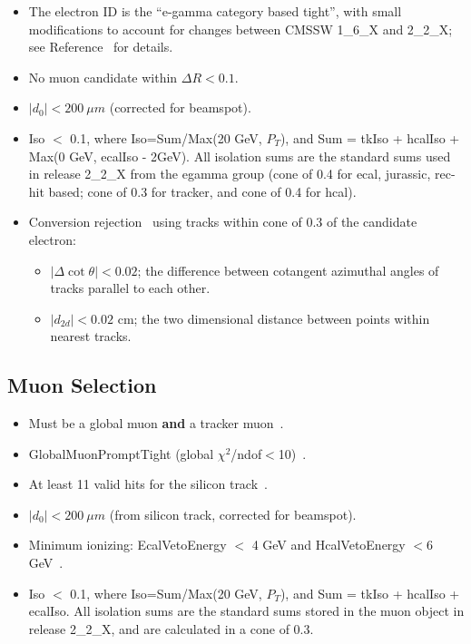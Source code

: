 \begin{itemize}
\item The electron ID is the ``e-gamma category based tight'', with small 
modifications to account for changes between CMSSW 1\_6\_X and 2\_2\_X; see Reference~\cite{ww} for details.
\item No muon candidate within $\Delta R < 0.1$.
\item $|d_0| < 200~\mu m$ (corrected for beamspot).
\item Iso $<$ 0.1, where Iso=Sum/Max(20 GeV, $P_T$), and Sum = tkIso + hcalIso +  Max(0 GeV, ecalIso - 2GeV).
All isolation sums are the standard sums used in release 2\_2\_X from the egamma group (cone of
0.4 for ecal, jurassic, rec-hit based; cone of 0.3 for tracker, and cone of 0.4 for hcal).
\item Conversion rejection~\cite{conversion} using tracks within cone of 0.3 of the candidate electron: 
\begin{itemize}
\item $|\Delta \cot\theta| < 0.02$; the difference between cotangent azimuthal angles of tracks parallel to 
each other.
\item $|d_{2d}| < 0.02$ cm; the two dimensional distance between points within nearest tracks.
\end{itemize} 
\end{itemize}

\subsection{Muon Selection}
\label{sec:muon}
\begin{itemize}
\item Must be a global muon {\bf and} a tracker muon~\cite{glbtrk}.
\item GlobalMuonPromptTight (global $\chi^2$/ndof$<$10)~\cite{muonid}.
\item At least 11 valid hits for the silicon track~\cite{muonid}.
\item $|d_0| < 200~\mu m$ (from silicon track, corrected for beamspot).
\item Minimum ionizing: EcalVetoEnergy $<$ 4 GeV and HcalVetoEnergy $<6$ GeV~\cite{vplusj}. 
\item Iso $<$ 0.1, where Iso=Sum/Max(20 GeV, $P_T$), and Sum = tkIso + hcalIso +  ecalIso.
All isolation sums are the standard sums stored in the muon object in release 2\_2\_X, and
are calculated in a cone of 0.3.
\end{itemize}

